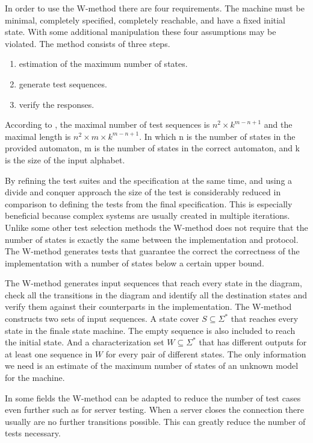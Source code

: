 \documentclass[multi,crop=false,class=article]{standalone}
\begin{document}
In order to use the W-method there are four requirements.
The machine must be minimal, completely specified, completely reachable, 
and have a fixed initial state.
With some additional manipulation these four assumptions may be violated.
The method consists of three steps.
\begin{enumerate}
\item estimation of the maximum number of states.
\item generate test sequences.
\item verify the responses.
\end{enumerate}

According to \cite{vasilevskii73}, the maximal number of test sequences is 
$n^{2} \times k^{m-n+1}$ and the maximal length is 
$n^{2} \times m \times k^{m-n+1}$.
In which n is the number of states in the provided automaton, m is the number
of states in the correct automaton, and k is the size of the input alphabet.

By refining the test suites and the specification at the same time, and
using a divide and conquer approach the size of the test is
considerably reduced in comparison to defining the tests from
the final specification\cite{Ipate07}.
This is especially beneficial because complex systems are usually
created in multiple iterations.
Unlike some other test selection methods the W-method does not require
that the number of states is exactly the same between
the implementation and protocol.
The W-method generates tests that guarantee the correct the
correctness of the implementation with a number of states below a
certain upper bound.

The W-method generates input sequences that reach every state in the
diagram, check all the transitions in the diagram and identify all the
destination states and verify them against their counterparts in
the implementation\cite{Ipate07}.
The W-method constructs two sets of input sequences.
A state cover $S \subseteq \Sigma^{*}$ that reaches every state in the
finale state machine.
The empty sequence is also included to reach the initial state.
And a characterization set $W \subseteq \Sigma^{*}$ that has different
outputs for at least one sequence in $W$ for every pair of different states.
The only information we need is an estimate of the maximum number of
states of an unknown model for the machine.

In some fields the W-method can be adapted to reduce the number of test
cases even further such as for server testing.
When a server closes the connection there usually are no further
transitions possible.
This can greatly reduce the number of tests necessary\cite{deRuiter15}.
\end{document}
